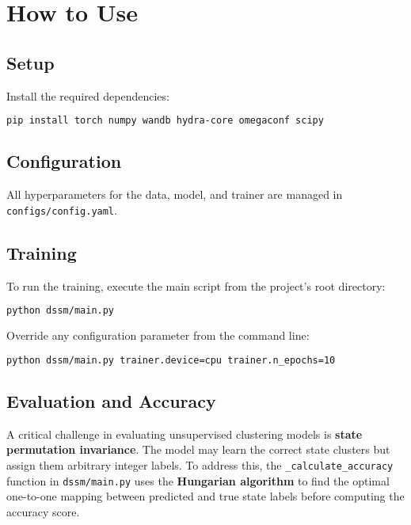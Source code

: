 \documentclass[11pt, a4paper]{article}
\begin{document}
\section{How to Use}

\subsection{Setup}
Install the required dependencies:
\begin{lstlisting}[language=bash]
pip install torch numpy wandb hydra-core omegaconf scipy
\end{lstlisting}

\subsection{Configuration}
All hyperparameters for the data, model, and trainer are managed in \texttt{configs/config.yaml}.

\subsection{Training}
To run the training, execute the main script from the project's root directory:
\begin{lstlisting}[language=bash]
python dssm/main.py
\end{lstlisting}
Override any configuration parameter from the command line:
\begin{lstlisting}[language=bash]
python dssm/main.py trainer.device=cpu trainer.n_epochs=10
\end{lstlisting}

\subsection{Evaluation and Accuracy}
A critical challenge in evaluating unsupervised clustering models is \textbf{state permutation invariance}. The model may learn the correct state clusters but assign them arbitrary integer labels. To address this, the \texttt{\_calculate\_accuracy} function in \texttt{dssm/main.py} uses the \textbf{Hungarian algorithm} to find the optimal one-to-one mapping between predicted and true state labels before computing the accuracy score.
\end{document}
